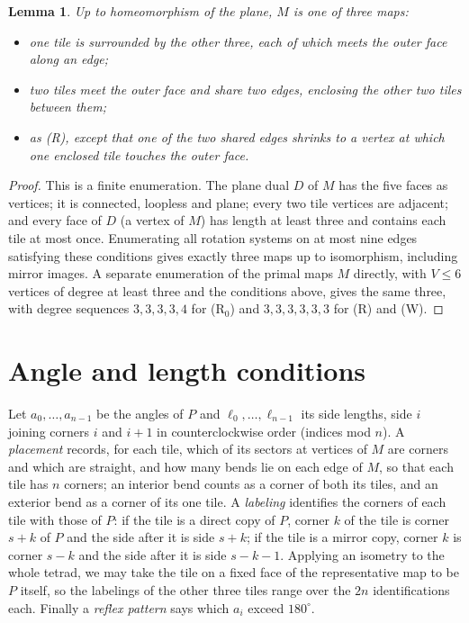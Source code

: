 \documentclass[11pt]{article}
\newtheorem{lemma}[theorem]{Lemma}
\theoremstyle{definition}
\theoremstyle{remark}
\begin{document}
\begin{lemma}\label{lem:maps}
Up to homeomorphism of the plane, $M$ is one of three maps:
\begin{itemize}
\item[(W)] one tile is surrounded by the other three, each of which meets
the outer face along an edge;
\item[(R)] two tiles meet the outer face and share two edges, enclosing the
other two tiles between them;
\item[(R$_0$)] as (R), except that one of the two shared edges shrinks to a
vertex at which one enclosed tile touches the outer face.
\end{itemize}
\end{lemma}

\begin{proof}
This is a finite enumeration. The plane dual $D$ of $M$ has the five faces
as vertices; it is connected, loopless and plane; every two tile vertices
are adjacent; and every face of
$D$ (a vertex of $M$) has length at least three and contains each tile at
most once. Enumerating all rotation systems on at most nine edges
satisfying these conditions gives exactly three maps up to isomorphism,
including mirror images. A separate enumeration of the primal maps $M$
directly, with $V\le6$ vertices of degree at least three and the
conditions above, gives the same three, with degree sequences
$3,3,3,3,4$ for (R$_0$) and $3,3,3,3,3,3$ for (R) and (W).
\end{proof}

\section{Angle and length conditions}\label{sec:conditions}

Let $a_0,\dots,a_{n-1}$ be the angles of $P$ and $\ell_0,\dots,\ell_{n-1}$ its
side lengths, side $i$ joining corners $i$ and $i+1$ in counterclockwise
order (indices mod $n$). A \emph{placement} records, for each tile, which of
its sectors at vertices of $M$ are corners and which are straight, and how
many bends lie on each edge of $M$, so that each tile has $n$ corners; an
interior bend counts as a corner of both its tiles, and an exterior bend as
a corner of its one tile. A
\emph{labeling} identifies the corners of each tile with those of $P$: if
the tile is a direct copy of $P$, corner $k$ of the tile is corner $s+k$ of
$P$ and the side after it is side $s+k$; if the tile is a mirror copy,
corner $k$ is corner $s-k$ and the side after it is side $s-k-1$. Applying
an isometry to the whole tetrad, we may take the tile on a fixed face of
the representative map to be $P$ itself, so the labelings of the other
three tiles range over the $2n$ identifications each. Finally a
\emph{reflex pattern} says which $a_i$ exceed $180^\circ$.
\end{document}
